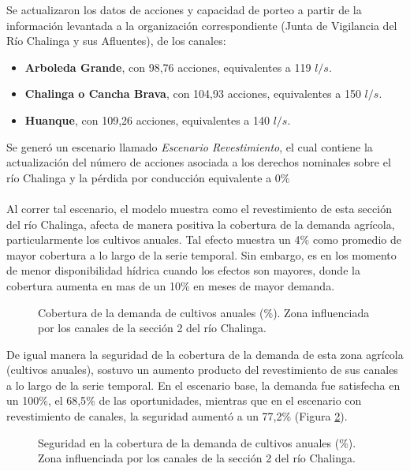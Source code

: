 \documentclass[]{article}
\begin{document}
Se actualizaron los datos de acciones y capacidad de porteo a partir de la información levantada a la organización correspondiente (Junta de Vigilancia del Río Chalinga y sus Afluentes), de los canales:
\begin{itemize}

\item \textbf{Arboleda Grande}, con 98,76 acciones, equivalentes a 119 $l/s$.
\item \textbf{Chalinga o Cancha Brava}, con 104,93 acciones, equivalentes a 150 $l/s$.
\item \textbf{Huanque}, con 109,26 acciones, equivalentes a 140 $l/s$.\\

\end{itemize}

Se generó un escenario llamado \textit{Escenario Revestimiento}, el cual contiene la actualización del número de acciones asociada a los derechos nominales sobre el río Chalinga
y la pérdida por conducción equivalente a 0$\%$ \\
\\
Al correr tal escenario, el modelo muestra como el revestimiento de esta sección del río Chalinga, afecta de manera positiva la cobertura de la demanda agrícola, particularmente los cultivos anuales. Tal efecto muestra un 4$\%$ como promedio de mayor cobertura a lo largo de la serie temporal. Sin embargo, es en los momento de menor disponibilidad hídrica cuando los efectos son mayores, donde la cobertura aumenta en mas de un 10$\%$ en meses de mayor demanda.

\begin{figure}[H]
\begin{center}
\caption{Cobertura de la demanda de cultivos anuales ($\%$). Zona influenciada por los canales de la sección 2 del río Chalinga.}
\label{etiqueta_figura9}
\end{center}
\end{figure}

De igual manera la seguridad de la cobertura de la demanda de esta zona agrícola (cultivos anuales), sostuvo un aumento producto del revestimiento de sus canales a lo largo de la serie temporal. En el escenario base, la demanda fue satisfecha en un 100$\%$, el 68,5$\%$ de las oportunidades, mientras que en el escenario con revestimiento de canales, la seguridad aumentó a un 77,2\% (Figura \ref{etiqueta_figura10}).

\begin{figure}[H]
\begin{center}
\caption{Seguridad en la cobertura de la demanda de cultivos anuales ($\%$). Zona influenciada por los canales de la sección 2 del río Chalinga.}
\label{etiqueta_figura10}
\end{center}
\end{figure}
\end{document}
